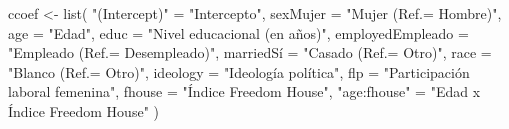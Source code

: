 \documentclass[
  12pt,
  a4paper,
]{article}
\newenvironment{Shaded}{\begin{snugshade}}{\end{snugshade}}
\newcommand{\AttributeTok}[1]{\textcolor[rgb]{0.77,0.63,0.00}{#1}}
\newcommand{\FunctionTok}[1]{\textcolor[rgb]{0.00,0.00,0.00}{#1}}
\newcommand{\NormalTok}[1]{#1}
\newcommand{\OtherTok}[1]{\textcolor[rgb]{0.56,0.35,0.01}{#1}}
\newcommand{\StringTok}[1]{\textcolor[rgb]{0.31,0.60,0.02}{#1}}
\begin{document}
\begin{Shaded}
\begin{Highlighting}[]
\NormalTok{ccoef }\OtherTok{\textless{}{-}} \FunctionTok{list}\NormalTok{(}
  \StringTok{"(Intercept)"} \OtherTok{=} \StringTok{"Intercepto"}\NormalTok{,}
  \AttributeTok{sexMujer =} \StringTok{"Mujer (Ref.= Hombre)"}\NormalTok{,}
  \AttributeTok{age =} \StringTok{"Edad"}\NormalTok{,}
  \AttributeTok{educ =} \StringTok{"Nivel educacional (en años)"}\NormalTok{,}
  \AttributeTok{employedEmpleado =} \StringTok{"Empleado (Ref.= Desempleado)"}\NormalTok{,}
\NormalTok{  marriedSí }\OtherTok{=} \StringTok{"Casado (Ref.= Otro)"}\NormalTok{,}
  \AttributeTok{race =} \StringTok{"Blanco (Ref.= Otro)"}\NormalTok{,}
  \AttributeTok{ideology =} \StringTok{"Ideología política"}\NormalTok{,}
  \AttributeTok{flp =} \StringTok{"Participación laboral femenina"}\NormalTok{,}
  \AttributeTok{fhouse =} \StringTok{"Índice Freedom House"}\NormalTok{,}
  \StringTok{"age:fhouse"} \OtherTok{=} \StringTok{"Edad x Índice Freedom House"}
\NormalTok{)}



\end{Highlighting}
\end{Shaded}
\end{document}
